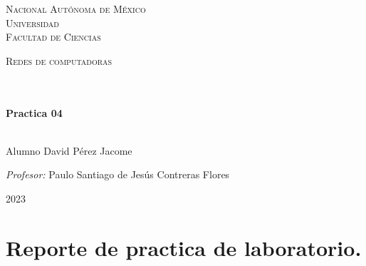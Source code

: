 \documentclass[14pt]{book}
\begin{document}
\begin{center}
\begin{minipage}{0.48\textwidth}
\begin{flushright}
    \end{flushright}
  \end{minipage}
  \vspace*{-1.5cm}
  \textsc{\huge Nacional Autónoma de México \\ \vspace{-4px} Universidad }\\[2cm]
  \textsc{\LARGE Facultad de Ciencias}\\[1.5cm]
  \begin{minipage}{0.9\textwidth}
    \begin{center}
      \textsc{\LARGE Redes de computadoras}
    \end{center}
  \end{minipage}\\[0.5cm]
  \vspace*{1cm}
  \HRule \\[0.4cm]
  { \huge \bfseries Practica 04}\\[0.4cm]
  \HRule \\[1.5cm]
  \begin{minipage}{0.52\textwidth}
    \begin{flushleft} \large \small \vspace{-0.6cm} \vspace{-0.6cm}
      Alumno David Pérez Jacome \\
    \end{flushleft}
  \end{minipage}
  \begin{minipage}{0.46\textwidth}
    \vspace{-0.6cm}
    \begin{flushright} \large \small \emph{Profesor:}
      Paulo Santiago de Jesús Contreras Flores	 \\
    \end{flushright}
  \end{minipage}
  \vspace*{1cm}
  \vspace{2cm}
  \begin{center}
    {\large 2023}
  \end{center}
\end{center}
\newpage

{\color{blue} \section*{\textbf{Reporte de practica de laboratorio.}}}
\vspace{1em}
\end{document}
